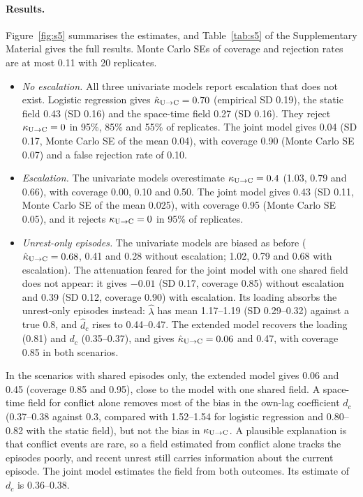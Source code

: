 \paragraph{Results.} Figure~\ref{fig:s5} summarises the estimates, and Table~\ref{tab:s5} of
the Supplementary Material gives the full results. Monte Carlo SEs of coverage and
rejection rates are at most 0.11 with 20 replicates.
\begin{itemize}
\item \emph{No escalation.} All three univariate models report escalation that does
not exist. Logistic regression gives $\hat\kappa_{\mathrm{U}\to\mathrm{C}}  = 0.70$ (empirical SD 0.19), the
static field 0.43 (SD 0.16) and the space-time field 0.27 (SD 0.16). They reject
$\kappa_{\mathrm{U}\to\mathrm{C}}  = 0$ in 95\%, 85\% and 55\% of replicates. The joint model gives 0.04 (SD 0.17,
Monte Carlo SE of the mean 0.04), with coverage 0.90 (Monte Carlo SE 0.07) and a false
rejection rate of 0.10.
\item \emph{Escalation.} The univariate models overestimate $\kappa_{\mathrm{U}\to\mathrm{C}}  = 0.4$ (1.03, 0.79
and 0.66), with coverage 0.00, 0.10 and 0.50. The joint model gives 0.43 (SD 0.11,
Monte Carlo SE of the mean 0.025), with coverage 0.95 (Monte Carlo SE 0.05), and it
rejects $\kappa_{\mathrm{U}\to\mathrm{C}}  = 0$ in 95\% of replicates.
\item \emph{Unrest-only episodes.} The univariate models are biased as before
($\hat\kappa_{\mathrm{U}\to\mathrm{C}}  = 0.68$, 0.41 and 0.28 without escalation; 1.02, 0.79 and 0.68 with
escalation). The attenuation feared for the joint model with one shared field does not
appear: it gives $-0.01$ (SD 0.17, coverage 0.85) without escalation and 0.39 (SD
0.12, coverage 0.90) with escalation. Its loading absorbs the unrest-only episodes
instead: $\hat\lambda$ has mean 1.17--1.19 (SD 0.29--0.32) against a true 0.8, and
$\hat d_c$ rises to 0.44--0.47. The extended model recovers the loading (0.81) and
$d_c$ (0.35--0.37), and gives $\hat\kappa_{\mathrm{U}\to\mathrm{C}}  = 0.06$ and 0.47, with coverage 0.85 in both
scenarios.
\end{itemize}
In the scenarios with shared episodes only, the extended model gives 0.06 and 0.45 (coverage 0.85 and 0.95), close to
the model with one shared field.
A space-time field for conflict alone removes most of the bias in the own-lag
coefficient $d_c$ (0.37--0.38 against 0.3, compared with 1.52--1.54 for logistic
regression and 0.80--0.82 with the static field), but not the bias in $\kappa_{\mathrm{U}\to\mathrm{C}}$. A
plausible explanation is that conflict events are rare, so a field estimated from
conflict alone tracks the episodes poorly, and recent unrest still carries information
about the current episode. The joint model estimates the field from both outcomes. Its
estimate of $d_c$ is 0.36--0.38.

